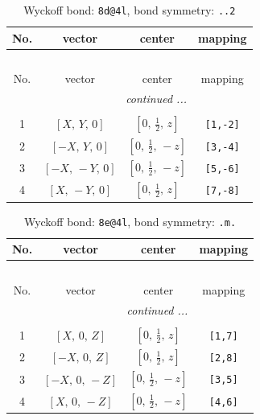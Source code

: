 \documentclass[fleqn,8pt]{jsarticle}
\begin{document}
\begin{longtable}{cccc}
\caption{Wyckoff bond: {\tt 8d@4l}, bond symmetry: {\tt ..2}}
 \\
 \hline \hline
No. & vector & center & mapping \\ \hline \endfirsthead

\multicolumn{3}{l}{\tablename\ \thetable{}} \\
 \hline \hline
No. & vector & center & mapping \\ \hline \endhead

 \hline \hline
\multicolumn{3}{r}{\footnotesize\it continued ...} \\ \endfoot

 \hline \hline
\multicolumn{3}{r}{} \\ \endlastfoot

1 & $\left[ X,\, Y,\, 0 \right]$ & $\left[ 0,\, \frac{1}{2},\, z \right]$ & {\tt [1,-2]} \\ \hline
2 & $\left[ - X,\, Y,\, 0 \right]$ & $\left[ 0,\, \frac{1}{2},\, - z \right]$ & {\tt [3,-4]} \\ \hline
3 & $\left[ - X,\, - Y,\, 0 \right]$ & $\left[ 0,\, \frac{1}{2},\, - z \right]$ & {\tt [5,-6]} \\ \hline
4 & $\left[ X,\, - Y,\, 0 \right]$ & $\left[ 0,\, \frac{1}{2},\, z \right]$ & {\tt [7,-8]} \\
\end{longtable}
\renewcommand{\arraystretch}{1.2}
\begin{longtable}{cccc}
\caption{Wyckoff bond: {\tt 8e@4l}, bond symmetry: {\tt .m.}}
 \\
 \hline \hline
No. & vector & center & mapping \\ \hline \endfirsthead

\multicolumn{3}{l}{\tablename\ \thetable{}} \\
 \hline \hline
No. & vector & center & mapping \\ \hline \endhead

 \hline \hline
\multicolumn{3}{r}{\footnotesize\it continued ...} \\ \endfoot

 \hline \hline
\multicolumn{3}{r}{} \\ \endlastfoot

1 & $\left[ X,\, 0,\, Z \right]$ & $\left[ 0,\, \frac{1}{2},\, z \right]$ & {\tt [1,7]} \\ \hline
2 & $\left[ - X,\, 0,\, Z \right]$ & $\left[ 0,\, \frac{1}{2},\, z \right]$ & {\tt [2,8]} \\ \hline
3 & $\left[ - X,\, 0,\, - Z \right]$ & $\left[ 0,\, \frac{1}{2},\, - z \right]$ & {\tt [3,5]} \\ \hline
4 & $\left[ X,\, 0,\, - Z \right]$ & $\left[ 0,\, \frac{1}{2},\, - z \right]$ & {\tt [4,6]} \\
\end{longtable}
\end{document}
